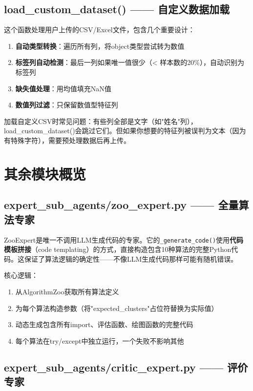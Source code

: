\documentclass[11pt,a4paper]{ctexbook}
\begin{document}
\subsection{load\_custom\_dataset() —— 自定义数据加载}

这个函数处理用户上传的CSV/Excel文件，包含几个重要设计：
\begin{enumerate}
    \item \textbf{自动类型转换}：遍历所有列，将object类型尝试转为数值
    \item \textbf{标签列自动检测}：最后一列如果唯一值很少（< 样本数的20\%），自动识别为标签列
    \item \textbf{缺失值处理}：用均值填充NaN值
    \item \textbf{数值列过滤}：只保留数值型特征列
\end{enumerate}

\begin{notebox}
    加载自定义CSV时常见问题：有些列全部是文字（如"姓名"列），load\_custom\_dataset()会跳过它们。但如果你想要的特征列被误判为文本（因为有特殊字符），需要预处理数据后再上传。
\end{notebox}

\section{其余模块概览}

\subsection{expert\_sub\_agents/zoo\_expert.py —— 全量算法专家}

ZooExpert是唯一不调用LLM生成代码的专家。它的\verb|_generate_code()|使用\textbf{代码模板拼接}（code templating）的方式，直接构造包含10种算法的完整Python代码。这保证了算法逻辑的确定性——不像LLM生成代码那样可能有随机错误。

核心逻辑：
\begin{enumerate}
    \item 从AlgorithmZoo获取所有算法定义
    \item 为每个算法构造参数（将"expected\_clusters"占位符替换为实际值）
    \item 动态生成包含所有import、评估函数、绘图函数的完整代码
    \item 每个算法在try/except中独立运行，一个失败不影响其他
\end{enumerate}

\subsection{expert\_sub\_agents/critic\_expert.py —— 评价专家}
\end{document}

